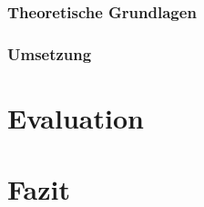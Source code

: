 \documentclass[paper=a4, fontsize=12pt]{scrartcl}
\numberwithin{equation}{section}		%
\numberwithin{figure}{section}			%
\numberwithin{table}{section}				%
\begin{document}
\subsubsection{Theoretische Grundlagen}
\subsubsection{Umsetzung}

\section{Evaluation}

\section{Fazit}





\printbibliography
\end{document}
